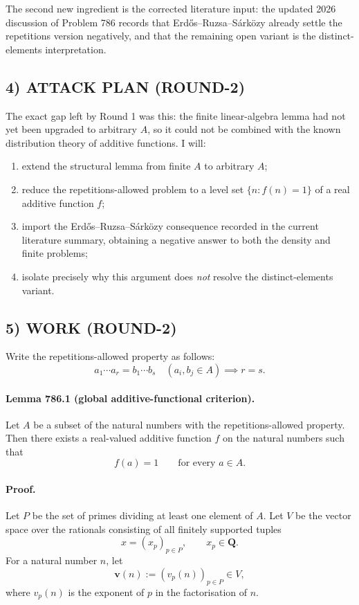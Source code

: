 The second new ingredient is the corrected literature input: the updated 2026 discussion of Problem 786 records that Erd\H{o}s--Ruzsa--S\'ark\"ozy already settle the repetitions version negatively, and that the remaining open variant is the distinct-elements interpretation.

\subsection*{4) ATTACK PLAN (ROUND-2)}
The exact gap left by Round 1 was this: the finite linear-algebra lemma had not yet been upgraded to arbitrary $A$, so it could not be combined with the known distribution theory of additive functions. I will:
\begin{enumerate}
\item extend the structural lemma from finite $A$ to arbitrary $A$;
\item reduce the repetitions-allowed problem to a level set $\{n : f(n)=1\}$ of a real additive function $f$;
\item import the Erd\H{o}s--Ruzsa--S\'ark\"ozy consequence recorded in the current literature summary, obtaining a negative answer to both the density and finite problems;
\item isolate precisely why this argument does \emph{not} resolve the distinct-elements variant.
\end{enumerate}

\subsection*{5) WORK (ROUND-2)}
Write the repetitions-allowed property as follows:
\[
 a_1 \cdots a_r = b_1 \cdots b_s \quad (a_i,b_j \in A)
 \implies r=s.
\]

\paragraph{Lemma 786.1 (global additive-functional criterion).}
Let $A$ be a subset of the natural numbers with the repetitions-allowed property. Then there exists a real-valued additive function $f$ on the natural numbers such that
\[
 f(a)=1 \qquad \text{for every } a \in A.
\]

\paragraph{Proof.}
Let $P$ be the set of primes dividing at least one element of $A$. Let $V$ be the vector space over the rationals consisting of all finitely supported tuples
\[
 x=(x_p)_{p \in P}, \qquad x_p \in \mathbf Q.
\]
For a natural number $n$, let
\[
 \mathbf v(n) := (v_p(n))_{p \in P} \in V,
\]
where $v_p(n)$ is the exponent of $p$ in the factorisation of $n$.


